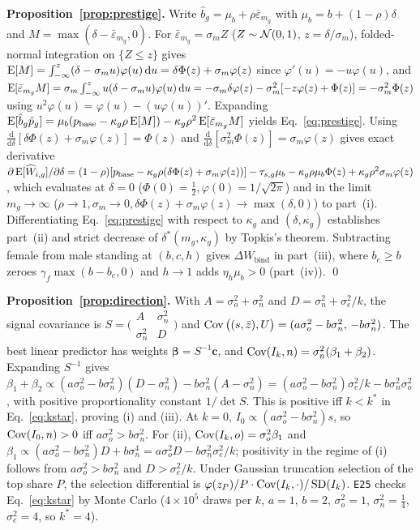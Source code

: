 \noindent\textbf{Proposition~\ref{prop:prestige}.} Write $\hat b_g=\mu_b+\rho\bar\varepsilon_{m_g}$ with $\mu_b=b+(1-\rho)\delta$ and $M=\max(\delta-\bar\varepsilon_{m_g},0)$. For $\bar\varepsilon_{m_g}=\sigma_m Z$ ($Z\sim\mathcal{N}(0,1)$, $z=\delta/\sigma_m$), folded-normal integration on $\{Z\le z\}$ gives $\operatorname{E}[M]=\int_{-\infty}^z(\delta-\sigma_m u)\varphi(u)\,\mathrm du=\delta\Phi(z)+\sigma_m\varphi(z)$ since $\varphi'(u)=-u\varphi(u)$, and $\operatorname{E}[\bar\varepsilon_{m_g}M]=\sigma_m\int_{-\infty}^z u(\delta-\sigma_m u)\varphi(u)\,\mathrm du=-\sigma_m\delta\varphi(z)-\sigma_m^2[-z\varphi(z)+\Phi(z)]=-\sigma_m^2\Phi(z)$ using $u^2\varphi(u)=\varphi(u)-(u\varphi(u))'$. Expanding $\operatorname{E}[\hat b_g\hat p_g]=\mu_b(p_{\mathrm{base}}-\kappa_g\rho\operatorname{E}[M])-\kappa_g\rho^2\operatorname{E}[\bar\varepsilon_{m_g}M]$ yields Eq.~\eqref{eq:prestige}. Using $\tfrac{\mathrm d}{\mathrm d\delta}[\delta\Phi(z)+\sigma_m\varphi(z)]=\Phi(z)$ and $\tfrac{\mathrm d}{\mathrm d\delta}[\sigma_m^2\Phi(z)]=\sigma_m\varphi(z)$ gives exact derivative
$\partial\operatorname{E}[\widehat W_{i,g}]/\partial\delta=(1-\rho)[p_{\mathrm{base}}-\kappa_g\rho(\delta\Phi(z)+\sigma_m\varphi(z))]-\tau_{s,g}\mu_b-\kappa_g\rho\mu_b\Phi(z)+\kappa_g\rho^2\sigma_m\varphi(z)$,
which evaluates at $\delta=0$ ($\Phi(0)=\tfrac12,\varphi(0)=1/\sqrt{2\pi}$) and in the limit $m_g\to\infty$ ($\rho\to 1,\sigma_m\to 0,\delta\Phi(z)+\sigma_m\varphi(z)\to\max(\delta,0)$) to part~(i). Differentiating Eq.~\eqref{eq:prestige} with respect to $\kappa_g$ and $(\delta,\kappa_g)$ establishes part~(ii) and strict decrease of $\delta^*(m_g,\kappa_g)$ by Topkis's theorem. Subtracting female from male standing at $(b,c,h)$ gives $\Delta W_{\mathrm{bind}}$ in part~(iii), where $b_e\ge b$ zeroes $\gamma_f\max(b-b_e,0)$ and $h\to 1$ adds $\eta_h\mu_b>0$ (part~(iv)). \qed

\noindent\textbf{Proposition~\ref{prop:direction}.} With $A=\sigma_o^2+\sigma_n^2$ and $D=\sigma_n^2+\sigma_e^2/k$, the signal covariance is $S=\bigl(\begin{smallmatrix}A&\sigma_n^2\\ \sigma_n^2&D\end{smallmatrix}\bigr)$ and $\operatorname{Cov}\big((s,\bar z),U\big)=(a\sigma_o^2-b\sigma_n^2,\,-b\sigma_n^2)$. The best linear predictor has weights $\boldsymbol\beta=S^{-1}\mathbf c$, and $\operatorname{Cov}(I_k,n)=\sigma_n^2(\beta_1+\beta_2)$. Expanding $S^{-1}$ gives $\beta_1+\beta_2\propto(a\sigma_o^2-b\sigma_n^2)(D-\sigma_n^2)-b\sigma_n^2(A-\sigma_n^2)=(a\sigma_o^2-b\sigma_n^2)\sigma_e^2/k-b\sigma_n^2\sigma_o^2$, with positive proportionality constant $1/\det S$. This is positive iff $k<k^*$ in Eq.~\eqref{eq:kstar}, proving (i) and (iii). At $k=0$, $I_0\propto(a\sigma_o^2-b\sigma_n^2)s$, so $\operatorname{Cov}(I_0,n)>0$ iff $a\sigma_o^2>b\sigma_n^2$. For (ii), $\operatorname{Cov}(I_k,o)=\sigma_o^2\beta_1$ and $\beta_1\propto(a\sigma_o^2-b\sigma_n^2)D+b\sigma_n^4=a\sigma_o^2D-b\sigma_n^2\sigma_e^2/k$; positivity in the regime of (i) follows from $a\sigma_o^2>b\sigma_n^2$ and $D>\sigma_e^2/k$. Under Gaussian truncation selection of the top share $P$, the selection differential is $\varphi(z_P)/P\cdot\operatorname{Cov}(I_k,\cdot)/\operatorname{SD}(I_k)$. \texttt{E25} checks Eq.~\eqref{eq:kstar} by Monte Carlo ($4\times10^5$ draws per $k$, $a=1$, $b=2$, $\sigma_o^2=1$, $\sigma_n^2=\tfrac14$, $\sigma_e^2=4$, so $k^*=4$).


